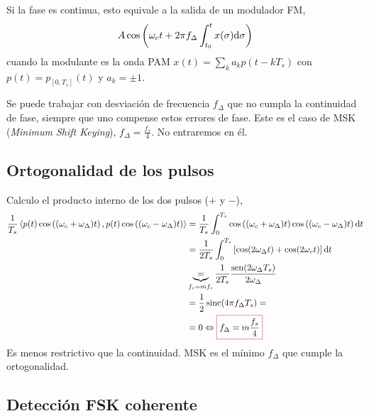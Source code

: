     \begin{remarkSN}
        Si la fase es continua, esto equivale a la salida de un modulador FM,
        \[A\cos\left(\omega_ct +2\pi f_\Delta \int_{t_0}^t x(\sigma) \mathrm{d}\sigma\right)\]
        cuando la modulante es la onda PAM $x(t)=\sum_k a_k p(t-kT_s)$ con $p(t)=p_{[0,T_s]}(t)$ y $a_k=\pm 1$.
    \end{remarkSN}

    \begin{remarkSN}
        Se puede trabajar con desviación de frecuencia $f_\Delta$ que no cumpla la continuidad de fase, siempre que uno compense estos errores de fase. Este es el caso de MSK (\emph{Minimum Shift Keying}), $f_\Delta=\frac{f_s}{4}$. No entraremos en él.
    \end{remarkSN}

\subsection*{Ortogonalidad de los pulsos}
Calculo el producto
interno de los dos pulsos ($+$ y $-$),
    \begin{align*}
        \frac{1}{T_s}\left<p(t)\cos\left((\omega_c+\omega_\Delta)t\right),p(t)\cos\left((\omega_c-\omega_\Delta)t\right)\right>
        &= \frac{1}{T_s}\int_0^{T_s} \cos\left((\omega_c+\omega_\Delta)t\right)\cos\left((\omega_c-\omega_\Delta)t\right)\d t \\
        & = \frac{1}{2T_s}\int_0^{T_s}\left[\cos(2\omega_\Delta t)+\cos(2\omega_c t)\right]\d t\\
      & \underbrace{=}_{f_c=mf_s} \frac{1}{2T_s} \frac{\sen(2\omega_\Delta T_s)}{2\omega_\Delta} \\
      &=  \frac{1}{2}\sinc(4\pi f_\Delta T_s)=\\
        &= 0 \Leftrightarrow \col{f_\Delta = m\frac{f_s}{4}}
    \end{align*}
    Es menos restrictivo que la continuidad. MSK es el mínimo $f_\Delta$ que cumple la ortogonalidad.

\newpage

\subsection*{Detección FSK coherente}


